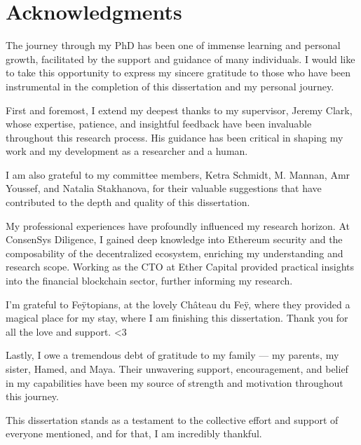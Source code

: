
\chapter*{Acknowledgments}

The journey through my PhD has been one of immense learning and personal growth, facilitated by the support and guidance of many individuals. I would like to take this opportunity to express my sincere gratitude to those who have been instrumental in the completion of this dissertation and my personal journey.

First and foremost, I extend my deepest thanks to my supervisor, Jeremy Clark, whose expertise, patience, and insightful feedback have been invaluable throughout this research process. His guidance has been critical in shaping my work and my development as a researcher and a human. 


I am also grateful to my committee members, Ketra Schmidt, M. Mannan, Amr Youssef, and Natalia Stakhanova, for their valuable suggestions that have contributed to the depth and quality of this dissertation. %

My professional experiences have profoundly influenced my research horizon. At ConsenSys Diligence, I gained deep knowledge into Ethereum security and the composability of the decentralized ecosystem, enriching my understanding and research scope. Working as the CTO at Ether Capital provided practical insights into the financial blockchain sector, further informing my research. 

I'm grateful to Fe\"ytopians, at the lovely Ch\^ateau du Fe\"y, where they provided a magical place for my stay, where I am finishing this dissertation. Thank you for all the love and support. \textless3 


Lastly, I owe a tremendous debt of gratitude to my family — my parents, my sister, Hamed, and Maya. Their unwavering support, encouragement, and belief in my capabilities have been my source of strength and motivation throughout this journey.

This dissertation stands as a testament to the collective effort and support of everyone mentioned, and for that, I am incredibly thankful.



